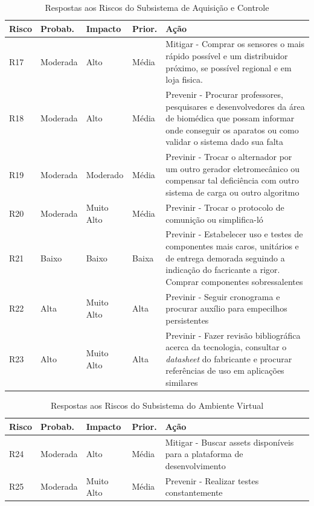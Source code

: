 \begin{table}[H]
\centering
\caption{Respostas aos Riscos do Subsistema de Aquisição e Controle}
\label{respostas-riscos-negativos}
\begin{tabular}{|l|l|l|l|p{9cm}|}
\hline
Risco & Probab.    & Impacto    & Prior. & Ação      \\
\hline


R17 & Moderada & Alto & Média & Mitigar - Comprar os sensores o mais rápido possível e um distribuidor próximo, se possível regional e em loja fisica. \\R18 & Moderada & Alto & Média & Prevenir - Procurar professores, pesquisares e desenvolvedores da área de biomédica que possam informar onde conseguir os aparatos ou como validar o sistema dado sua falta \\
R19 & Moderada & Moderado & Média & Previnir - Trocar o alternador por um outro gerador eletromecânico ou compensar tal deficiência com outro sistema de carga ou outro algoritmo\\
R20 & Moderada & Muito Alto & Média & Previnir - Trocar o protocolo de comunição ou simplifica-ló \\
R21 & Baixo & Baixo & Baixa & Previnir - Estabelecer uso e testes de componentes mais caros, unitários e de entrega demorada seguindo a indicação do facricante a rigor. Comprar componentes sobressalentes\\

R22 & Alta &  Muito Alto & Alta & Previnir - Seguir cronograma e procurar auxílio para empecilhos persistentes \\

R23 & Alto & Muito Alto & Alta & Previnir - Fazer revisão bibliográfica acerca da tecnologia, consultar o \textit{datasheet} do fabricante e procurar referências de uso em aplicações similares \\
\hline

\end{tabular}
\end{table}

\begin{table}[H]
\centering
\caption{Respostas aos Riscos do Subsistema do Ambiente Virtual}
\label{respostas-riscos-negativos}
\begin{tabular}{|l|l|l|l|p{9cm}|}
\hline
Risco & Probab.    & Impacto    & Prior. & Ação      \\
\hline

R24 & Moderada & Alto & Média & Mitigar - Buscar assets disponíveis para a plataforma de desenvolvimento \\
R25 & Moderada & Muito Alto & Média & Prevenir - Realizar testes constantemente \\

\hline
\end{tabular}
\end{table}


